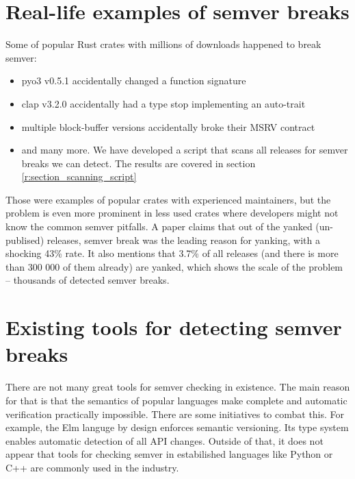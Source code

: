 \documentclass[licencjacka,en]{pracamgr}
\begin{document}
\section{Real-life examples of semver breaks} \label{r:section_real_life_semver_breaks}

Some of popular Rust crates with millions of downloads happened to break semver:
\begin{itemize}
    \item {\ttfamily pyo3 v0.5.1} accidentally changed a function signature \cite{pyo3-issue}
    \item {\ttfamily clap v3.2.0} accidentally had a type stop implementing an auto-trait
		\cite{clap-issue}
    \item multiple {\ttfamily block-buffer} versions accidentally broke their MSRV contract
		\cite{block-buffer-issue}
    \item and many more. We have developed a script that scans all releases for semver breaks we
		can detect. The results are covered in section \ref{r:section_scanning_script}
\end{itemize}

Those were examples of popular crates with experienced maintainers, but the problem is even more
prominent in less used crates where developers might not know the common semver pitfalls. A paper
\cite{paper} claims that out of the yanked (un-publised) releases, semver break was the leading
reason for yanking, with a shocking 43\% rate. It also mentions that 3.7\% of all releases
(and there is more than 300 000 of them already) are yanked, which shows the scale of the problem
-- thousands of detected semver breaks.

\section{Existing tools for detecting semver breaks}\label{r:section_existing_semver_tools}

There are not many great tools for semver checking in existence. The main reason for that is that
the semantics of popular languages make complete and automatic verification practically impossible.
There are some initiatives to combat this. For example, the Elm languge\cite{elm-lang} by design
enforces semantic versioning. Its type system enables automatic detection of all API changes.
Outside of that, it does not appear that tools for checking semver in estabilished languages like
Python or C++ are commonly used in the industry.
\end{document}
